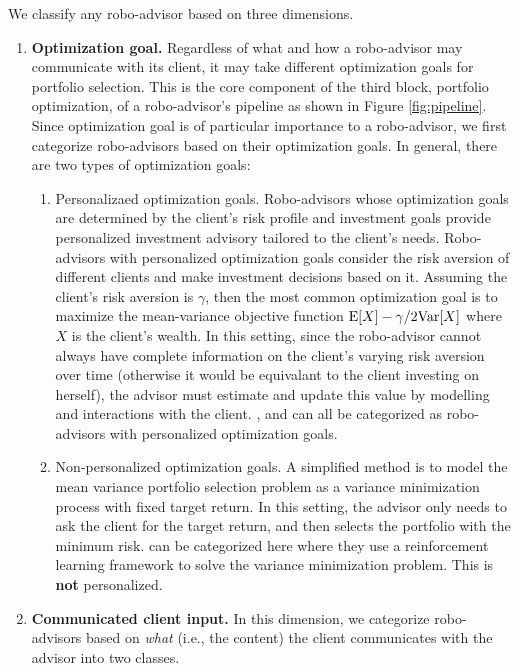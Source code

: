 We classify any robo-advisor based on three dimensions.\begin{enumerate}
    \item \textbf{Optimization goal.} Regardless of what and how a robo-advisor may communicate with its client, it may take different optimization goals for portfolio selection. This is the core component of the third block, portfolio optimization, of a robo-advisor's pipeline as shown in Figure \ref{fig:pipeline}. Since optimization goal is of particular importance to a robo-advisor, we first categorize robo-advisors based on their optimization goals. In general, there are two types of optimization goals:\begin{enumerate}
        \item Personalizaed optimization goals. Robo-advisors whose optimization goals are determined by the client's risk profile and investment goals provide personalized investment advisory tailored to the client's needs. Robo-advisors with personalized optimization goals consider the risk aversion of different clients and make investment decisions based on it. Assuming the client's risk aversion is $\gamma$, then the most common optimization goal is to maximize the mean-variance objective function $\mathrm{E}[X]-\gamma/2\mathrm{Var}[X]$ where $X$ is the client's wealth. In this setting, since the robo-advisor cannot always have complete information on the client's varying risk aversion over time (otherwise it would be equivalant to the client investing on herself), the advisor must estimate and update this value by modelling and interactions with the client. ,   and  can all be categorized as robo-advisors with personalized optimization goals.
        \item Non-personalized optimization goals. A simplified method is to model the mean variance portfolio selection problem as a variance minimization process with fixed target return. In this setting, the advisor only needs to ask the client for the target return, and then selects the portfolio with the minimum risk.  can be categorized here where they use a reinforcement learning framework to solve the variance minimization problem. This is \textbf{not} personalized.
    \end{enumerate}
    \item \textbf{Communicated client input.} In this dimension, we categorize robo-advisors based on \textit{what} (i.e., the content) the client communicates with the advisor into two classes.\begin{enumerate}

\end{enumerate}
\end{enumerate}

